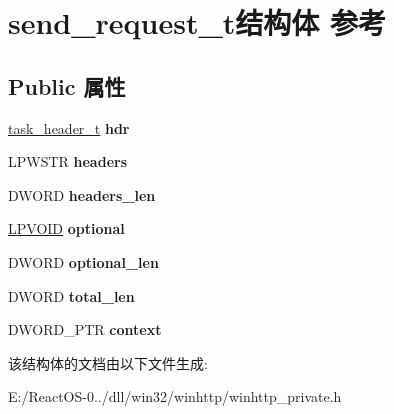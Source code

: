 \hypertarget{structsend__request__t}{}\section{send\+\_\+request\+\_\+t结构体 参考}
\label{structsend__request__t}
\subsection*{Public 属性}
\begin{DoxyCompactItemize}
\item 
\mbox{\label{structsend__request__t_a4d23f51da861484011d7c7f608a8aa94}} 
\hyperlink{structtask__header__t}{task\+\_\+header\+\_\+t} {\bfseries hdr}
\item 
\mbox{\label{structsend__request__t_a20027235d886b7a3a12e7eaec6486d14}} 
L\+P\+W\+S\+TR {\bfseries headers}
\item 
\mbox{\label{structsend__request__t_a95db1d9912542d4a89ae0ae0561f87fa}} 
D\+W\+O\+RD {\bfseries headers\+\_\+len}
\item 
\mbox{\label{structsend__request__t_aa9d94d1a8db3a85e7edb39d29e79ec19}} 
\hyperlink{interfacevoid}{L\+P\+V\+O\+ID} {\bfseries optional}
\item 
\mbox{\label{structsend__request__t_a304f0883c08130f52917a75dbc809e98}} 
D\+W\+O\+RD {\bfseries optional\+\_\+len}
\item 
\mbox{\label{structsend__request__t_af84ef11bb6e04c8cfc8464f35fd52eec}} 
D\+W\+O\+RD {\bfseries total\+\_\+len}
\item 
\mbox{\label{structsend__request__t_a162b7bad4b5f3736bb9ae06cac420b0e}} 
D\+W\+O\+R\+D\+\_\+\+P\+TR {\bfseries context}
\end{DoxyCompactItemize}


该结构体的文档由以下文件生成\+:\begin{DoxyCompactItemize}
\item 
E\+:/\+React\+O\+S-\/0../dll/win32/winhttp/winhttp\+\_\+private.\+h\end{DoxyCompactItemize}
